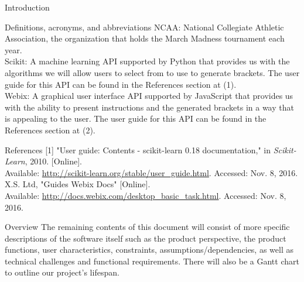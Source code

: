\documentclass[letterpaper, 10pt,titlepage]{article}
\begin{document}
\begin{section}{Introduction}
\begin{subsection}{Definitions, acronyms, and abbreviations}
NCAA: National Collegiate Athletic Association, the organization that holds the March Madness tournament each year.\\
Scikit: A machine learning API supported by Python that provides us with the algorithms we will allow users to select from to use to generate brackets. The user guide for this API can be found in the References section at (1).\\
Webix: A graphical user interface API supported by JavaScript that provides us with the ability to present instructions and the generated brackets in a way that is appealing to the user. The user guide for this API can be found in the References section at (2).
\end{subsection}

\begin{subsection}{References}
[1] "User guide: Contents - scikit-learn 0.18 documentation," in \textit{Scikit-Learn}, 2010. [Online]. \\Available:  {\url{http://scikit-learn.org/stable/user_guide.html}}. Accessed: Nov. 8, 2016.
\newline
[2] X.S. Ltd, "Guides Webix Docs" [Online]. \\Available:  {\url{http://docs.webix.com/desktop_basic_task.html}}. Accessed: Nov. 8, 2016. 
\end{subsection}

\begin{subsection}{Overview}
The remaining contents of this document will consist of more specific descriptions of the software itself such as the product perspective, the product functions, user characteristics, constraints, assumptions/dependencies, as well as technical challenges and functional requirements. There will also be a Gantt chart to outline our project's lifespan.
\end{subsection}

\end{section}
\end{document}
